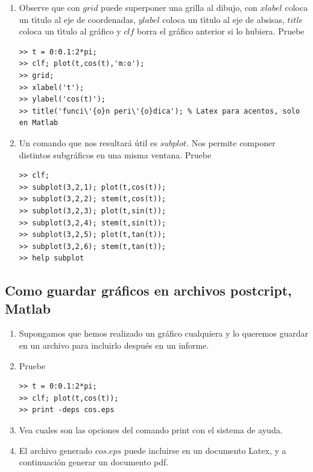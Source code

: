\begin{enumerate}
\item Observe que con $grid$ puede superponer una grilla al dibujo, con $%
xlabel$ coloca un t\'{\i}tulo al eje de coordenadas, $ylabel$ coloca un
t\'{\i}tulo al eje de absisas, $title$ coloca un t\'{\i}tulo al gr\'{a}fico y $%
clf$ borra el gr\'{a}fico anterior si lo hubiera. Pruebe

\begin{verbatim}
>> t = 0:0.1:2*pi;
>> clf; plot(t,cos(t),'m:o');
>> grid;
>> xlabel('t');
>> ylabel('cos(t)');
>> title('funci\'{o}n peri\'{o}dica'); % Latex para acentos, solo en Matlab
\end{verbatim}

\item Un comando que nos resultar\'{a} \'{u}til es $subplot.$ Nos permite
componer distintos subgr\'{a}ficos en una misma ventana. Pruebe
\begin{verbatim}
>> clf;
>> subplot(3,2,1); plot(t,cos(t));
>> subplot(3,2,2); stem(t,cos(t));
>> subplot(3,2,3); plot(t,sin(t));
>> subplot(3,2,4); stem(t,sin(t));
>> subplot(3,2,5); plot(t,tan(t));
>> subplot(3,2,6); stem(t,tan(t));
>> help subplot
\end{verbatim}

\end{enumerate}

\subsection{Como guardar gr\'{a}ficos en archivos postcript, Matlab}

\begin{enumerate}

\item Supongamos que hemos realizado un gr\'{a}fico cualquiera y lo queremos
guardar en un archivo para incluirlo despu\'{e}s en un informe.

\item Pruebe
\begin{verbatim}
>> t = 0:0.1:2*pi;
>> clf; plot(t,cos(t));
>> print -deps cos.eps
\end{verbatim}

\item Vea cuales son las opciones del comando print con el sistema de
  ayuda.

\item El archivo generado $cos.eps$ puede incluirse en un documento
  Latex, y a continuaci\'{o}n generar un documento pdf.

\end{enumerate}

